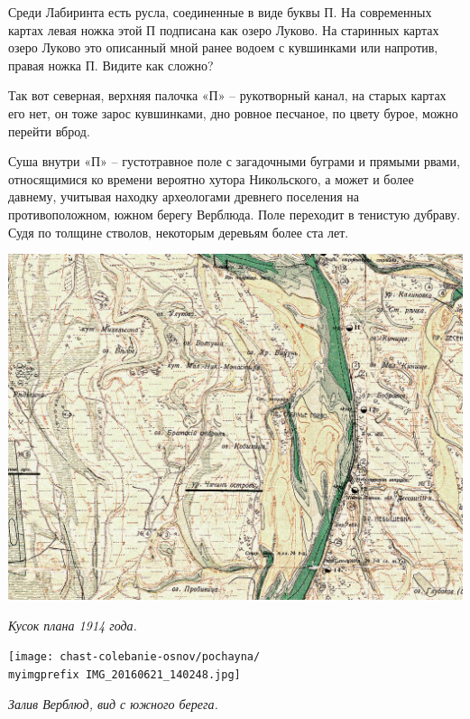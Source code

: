 Среди Лабиринта есть русла, соединенные в виде буквы П. На современных картах левая ножка этой П подписана как озеро Луково. На старинных картах озеро Луково это описанный мной ранее водоем с кувшинками или напротив, правая ножка П. Видите как сложно?

Так вот северная, верхняя палочка «П» – рукотворный канал, на старых картах его нет, он тоже зарос кувшинками, дно ровное песчаное, по цвету бурое, можно перейти вброд.

Суша внутри «П» – густотравное поле с загадочными буграми и прямыми рвами, относящимися ко времени вероятно хутора Никольского, а может и более давнему, учитывая находку археологами древнего поселения на противоположном, южном берегу Верблюда. Поле переходит в тенистую дубраву. Судя по толщине стволов, некоторым деревьям более ста лет.



\begin{center}
\includegraphics[width=\linewidth]{chast-colebanie-osnov/pochayna/itsunsrc.jpg}

\textit{Кусок плана 1914 года.}
\end{center}










\newpage

\begin{center}
\texttt{[image: chast-colebanie-osnov/pochayna/\\myimgprefix IMG\_20160621\_140248.jpg]}

\textit{Залив Верблюд, вид с южного берега.}
\end{center}


